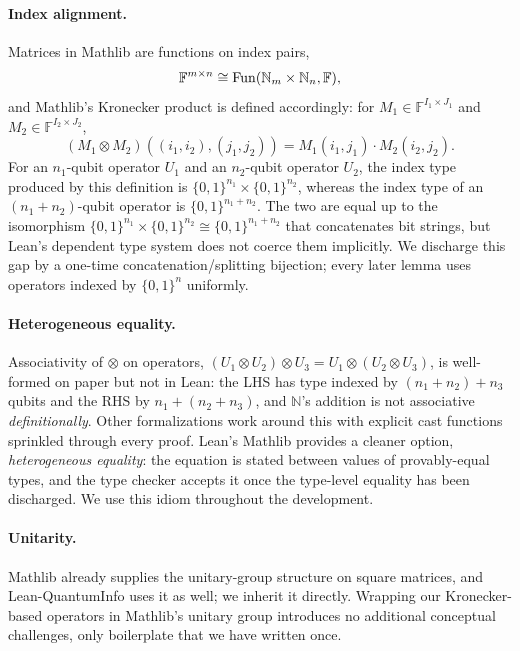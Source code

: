 \paragraph{Index alignment.} Matrices in Mathlib are functions on index pairs,
\begin{equation}
    \label{eq:mat-eq-fn}
    \mathbb{F}^{m \times n} \cong \operatorname{Fun}(\mathbb{N}_m \times \mathbb{N}_n, \mathbb{F}),
\end{equation}
and Mathlib's Kronecker product is defined accordingly: for $M_1 \in
\mathbb{F}^{I_1 \times J_1}$ and $M_2 \in \mathbb{F}^{I_2 \times J_2}$,
\begin{equation}
    (M_1 \otimes M_2)((i_1, i_2), (j_1, j_2)) = M_1(i_1, j_1) \cdot M_2(i_2, j_2).
\end{equation}
For an $n_1$-qubit operator $U_1$ and an $n_2$-qubit operator $U_2$, the index
type produced by this definition is $\{0,1\}^{n_1} \times \{0,1\}^{n_2}$,
whereas the index type of an $(n_1+n_2)$-qubit operator is $\{0,1\}^{n_1+n_2}$.
The two are equal up to the isomorphism $\{0,1\}^{n_1} \times \{0,1\}^{n_2}
\cong \{0,1\}^{n_1+n_2}$ that concatenates bit strings, but Lean's dependent
type system does not coerce them implicitly. We discharge this gap by a one-time
concatenation/splitting bijection; every later lemma uses operators indexed by
$\{0,1\}^{n}$ uniformly.

\paragraph{Heterogeneous equality.} Associativity of $\otimes$ on operators, $(U_1 \otimes U_2) \otimes U_3 = U_1
    \otimes (U_2 \otimes U_3)$,
is well-formed on paper but not in Lean: the LHS has type indexed by
$(n_1+n_2)+n_3$ qubits and the RHS by $n_1+(n_2+n_3)$, and $\mathbb{N}$'s
addition is not associative \emph{definitionally}. Other formalizations work
around this with explicit cast functions sprinkled through every proof. Lean's
Mathlib provides a cleaner option, \emph{heterogeneous equality}: the equation
is stated between values of provably-equal types, and the type checker accepts
it once the type-level equality has been discharged. We use this idiom
throughout the development.

\paragraph{Unitarity.} Mathlib already supplies the unitary-group structure on
square matrices, and Lean-QuantumInfo uses it as well; we inherit it directly.
Wrapping our Kronecker-based operators in Mathlib's unitary group introduces no
additional conceptual challenges, only boilerplate that we have written once.

